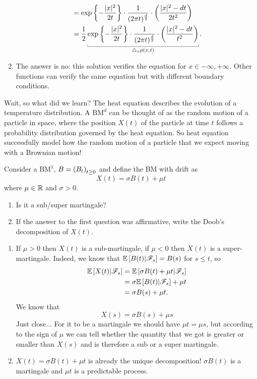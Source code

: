 \documentclass[12pt]{report}
\begin{document}
\begin{enumerate}
\begin{align*}
		&=\expg{-\frac{|x|^{2}}{2t}}\cdot\frac{1}{(2\pi t)^{\frac{d}{2}}}\cdot\left(\frac{|x|^{2}-dt}{2t^{2}}\right)\\
		&=\unmezz\ubracketthin{\expg{-\frac{|x|^{2}}{2t}}\cdot\frac{1}{(2\pi t)^{\frac{d}{2}}}\cdot\left(\frac{|x|^{2}-dt}{t^{2}}\right)}_{\triangle_{x}p(x,t)}.
	\end{align*}
	\item The answer is no: this solution verifies the equation for $x\in{-\infty,+\infty}$. Other functions can verify the same equation but with different boundary conditions.
\end{enumerate}
Wait, so what did we learn? The heat equation describes the evolution of a temperature distribution. A $\mathrm{BM}^{d}$ can be thought of as the random motion of a particle in space, where the position $X(t)$ of the particle at time $t$ follows a probability distribution governed by the heat equation. So heat equation successfully model how the random motion of a particle that we expect moving with a Brownian motion!
\begin{exercise}
	Consider a $\mathrm{BM}^{1}$, $B={(B_t)}_{t\geq 0}$ %
	and define the BM with drift as 
	\begin{equation*}
		X(t)=\sigma B(t)+\mu t
	\end{equation*}
	where $\mu\in\mathbb{R}$ and $\sigma>0$.
	\begin{enumerate}
		\item Is it a sub/super martingale?
		\item If the answer to the first question was affirmative, write the Doob's decomposition of $X(t)$.
	\end{enumerate}
\end{exercise}
\begin{enumerate}
	\item If $\mu>0$ then $X(t)$ is a sub-martingale, if $\mu<0$ then $X(t)$ is a super-martingale. Indeed, we know that $\mathbb{E}\left[B(t)|\mathscr{F}_{s}\right]=B(s)$ for $s\leq t$, so
	\begin{align*}
		\mathbb{E}\left[X(t)|\mathscr{F}_{s}\right]&=\mathbb{E}\left[\sigma B(t)+\mu t|\mathscr{F}_{s}\right]\\
		&=\sigma\mathbb{E}\left[B(t)|\mathscr{F}_{s}\right]+\mu t\\
		&=\sigma B(s)+\mu t.
	\end{align*}
	We know that 
	\begin{equation*}
		X(s)=\sigma B(s)+\mu s
	\end{equation*}Just close... For it to be a martingale we should have $\mu t=\mu s$, but according to the sign of $\mu$ we can tell whether the quantity that we got is greater or smaller than $X(s)$ and is therefore a sub or a super martingale.
	\item $	X(t)=\sigma B(t)+\mu t$ is already the unique decomposition! $\sigma B(t)$ is a martingale and $\mu t$ is a predictable process.
\end{enumerate}
\end{document}
